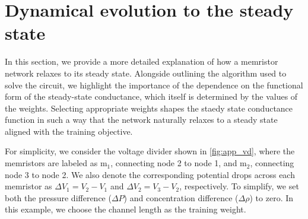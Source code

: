 \documentclass[reprint,superscriptaddress,prb,showkeys]{revtex4-2}
\newcommand{\m}{\text{m}} %
\begin{document}
\cleardoublepage
\appendix

\section{Dynamical evolution to the steady state \label{app:dyn_evol_steady_state}}

In this section, we provide a more detailed explanation of how a memristor network relaxes to its steady state. Alongside outlining the algorithm used to solve the circuit, we highlight the importance of the dependence on the functional form of the steady-state conductance, which itself is determined by the values of the weights. Selecting appropriate weights shapes the staedy state conductance function in such a way that the network naturally relaxes to a steady state aligned with the training objective.

For simplicity, we consider the voltage divider shown in \cref{fig:app_vd}, where the memristors are labeled as $ \m_1 $, connecting node 2 to node 1, and $ \m_2 $, connecting node 3 to node 2. We also denote the corresponding potential drops across each memristor as $ \Delta V_1 = V_2 - V_1$ and $ \Delta V_2  = V_3 - V_2$, respectively. To simplify, we set both the pressure difference ($ \Delta P $) and concentration difference ($ \Delta \rho $) to zero. In this example, we choose the channel length as the training weight.
\end{document}
